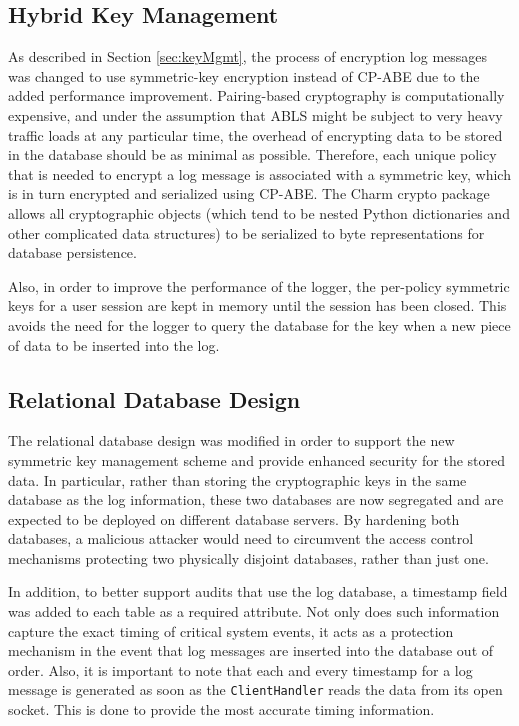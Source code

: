\documentclass{sig-alternate}
\begin{document}
\subsection{Hybrid Key Management}
As described in Section \ref{sec:keyMgmt}, the process of encryption log messages was changed to use symmetric-key
encryption instead of CP-ABE due to the added performance improvement. Pairing-based cryptography is computationally
expensive, and under the assumption that ABLS might be subject to very heavy traffic loads at any particular time, the 
overhead of encrypting data to be stored in the database should be as minimal as possible. Therefore, each unique
policy that is needed to encrypt a log message is associated with a symmetric key, which is in turn encrypted and 
serialized using CP-ABE. The Charm crypto package allows all cryptographic objects (which tend to be nested
Python dictionaries and other complicated data structures) to be serialized to byte representations for database 
persistence. 

Also, in order to improve the performance of the logger, the per-policy symmetric keys for a user session are kept
in memory until the session has been closed. This avoids the need for the logger to query the database for the key 
when a new piece of data to be inserted into the log. 

\subsection{Relational Database Design}
The relational database design was modified in order to support the new symmetric key management scheme and provide 
enhanced security for the stored data. In particular, rather than storing the cryptographic keys in the same database as the
log information, these two databases are now segregated and are expected to be deployed on different database servers.
By hardening both databases, a malicious attacker would need to circumvent the access control mechanisms protecting
two physically disjoint databases, rather than just one. 

In addition, to better support audits that use the log database, a timestamp field was added to each table as a required
attribute. Not only does such information capture the exact timing of critical system events, it acts as a protection
mechanism in the event that log messages are inserted into the database out of order. Also, it is important to note that
each and every timestamp for a log message is generated as soon as the {\tt ClientHandler} reads the data from
its open socket. This is done to provide the most accurate timing information.
\end{document}
